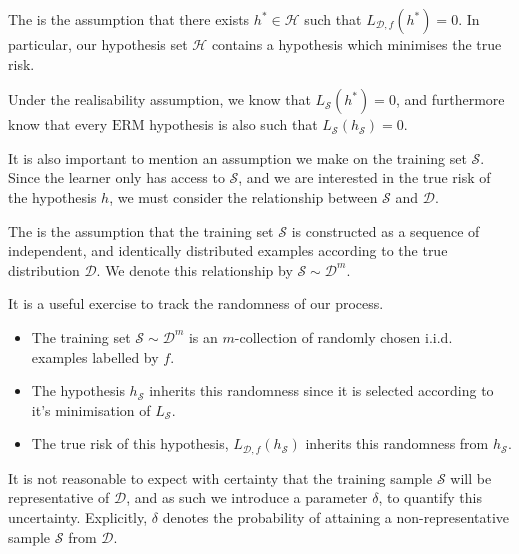 \begin{definition}
	The  is the assumption that there exists $ h ^{*} \in \mathcal{H} $ such that $ L_{\mathcal{D}, f}( h ^{*} ) = 0 $. In particular, our hypothesis set $ \mathcal{H} $ contains a hypothesis which minimises the true risk.
\end{definition}

Under the realisability assumption, we know that $ L_{\mathcal{S}}( h ^{*} ) = 0 $, and furthermore know that every $ \mathrm{ERM} $ hypothesis is also such that $ L_{\mathcal{S}}( h_{\mathcal{S}} ) = 0 $.

It is also important to mention an assumption we make on the training set $ \mathcal{S} $. Since the learner only has access to $ \mathcal{S} $, and we are interested in the true risk of the hypothesis $ h $, we must consider the relationship between $ \mathcal{S} $ and $ \mathcal{D} $.

\begin{definition}
	The  is the assumption that the training set $ \mathcal{S} $ is constructed as a sequence of independent, and identically distributed examples according to the true distribution $ \mathcal{D} $. We denote this relationship by $ \mathcal{S} \sim \mathcal{D}^{m} $.
\end{definition}

\begin{remark}
	It is a useful exercise to track the randomness of our process.
	\begin{itemize}
		\item The training set $ \mathcal{S} \sim \mathcal{D}^{m} $ is an $ m $-collection of randomly chosen i.i.d. examples labelled by $ f $.
		\item The hypothesis $ h_{\mathcal{S}} $ inherits this randomness since it is selected according to it's minimisation of $ L_{\mathcal{S}} $.
		\item The true risk of this hypothesis, $ L_{\mathcal{D}, f}( h_{\mathcal{S}} ) $ inherits this randomness from $ h_{\mathcal{S}} $.
	\end{itemize}

	It is not reasonable to expect with certainty that the training sample $ \mathcal{S} $ will be representative of $ \mathcal{D} $, and as such we introduce a parameter $ \delta $, to quantify this uncertainty. Explicitly, $ \delta $ denotes the probability of attaining a non-representative sample $ \mathcal{S} $ from $ \mathcal{D} $.
\end{remark}

